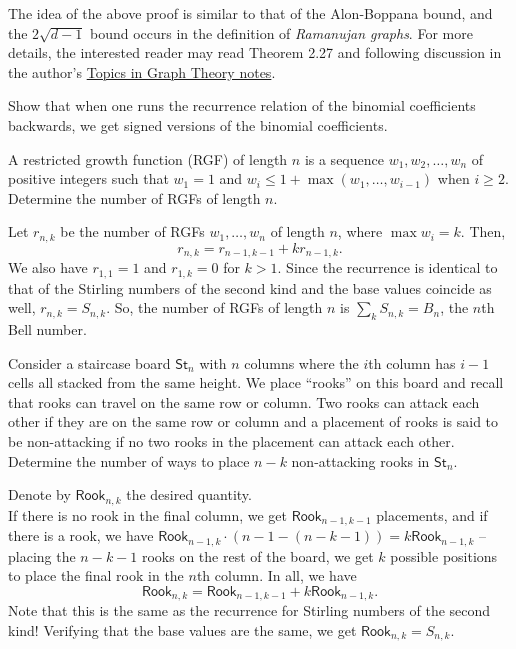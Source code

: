 		The idea of the above proof is similar to that of the Alon-Boppana bound, and the $2\sqrt{d-1}$ bound occurs in the definition of \emph{Ramanujan graphs}. For more details, the interested reader may read Theorem 2.27 and following discussion in the author's \href{https://amitrajaraman.github.io/notes/ma-5109/main.pdf}{Topics in Graph Theory notes}.

		\begin{problem}
			Show that when one runs the recurrence relation of the binomial coefficients backwards, we get signed versions of the binomial coefficients.
		\end{problem}

		\begin{problem}
			A restricted growth function (RGF) of length $n$ is a sequence $w_1,w_2,\ldots,w_n$ of positive integers such that $w_1 = 1$ and $w_i \le 1 + \max(w_1,\ldots,w_{i-1})$ when $i \ge 2$. Determine the number of RGFs of length $n$.
		\end{problem}
		\begin{solution*}
			Let $r_{n,k}$ be the number of RGFs $w_1,\ldots,w_n$ of length $n$, where $\max w_i = k$. Then,
			\[ r_{n,k} = r_{n-1,k-1} + k r_{n-1,k}. \]
			We also have $r_{1,1} = 1$ and $r_{1,k} = 0$ for $k > 1$. Since the recurrence is identical to that of the Stirling numbers of the second kind and the base values coincide as well, $r_{n,k} = S_{n,k}$. So, the number of RGFs of length $n$ is $\sum_k S_{n,k} = B_n$, the $n$th Bell number.
		\end{solution*}

		\begin{problem}
			Consider a staircase board $\mathsf{St}_n$ with $n$ columns where the $i$th column has $i-1$ cells all stacked from the same height. We place ``rooks'' on this board and recall that rooks can travel on the same row or column. Two rooks can attack each other if they are on the same row or column and a placement of rooks is said to be non-attacking if no two rooks in the placement can attack each other. Determine the number of ways to place $n-k$ non-attacking rooks in $\mathsf{St}_n$.
		\end{problem}
		\begin{solution*}
			Denote by $\mathsf{Rook}_{n,k}$ the desired quantity.\\
			If there is no rook in the final column, we get $\mathsf{Rook}_{n-1,k-1}$ placements, and if there is a rook, we have $\mathsf{Rook}_{n-1,k} \cdot (n-1 - (n-k-1)) = k \mathsf{Rook}_{n-1,k}$ -- placing the $n-k-1$ rooks on the rest of the board, we get $k$ possible positions to place the final rook in the $n$th column. In all, we have
			\[ \mathsf{Rook}_{n,k} = \mathsf{Rook}_{n-1,k-1} + k \mathsf{Rook}_{n-1,k}. \]
			Note that this is the same as the recurrence for Stirling numbers of the second kind! Verifying that the base values are the same, we get $\mathsf{Rook}_{n,k} = S_{n,k}$.
		\end{solution*}